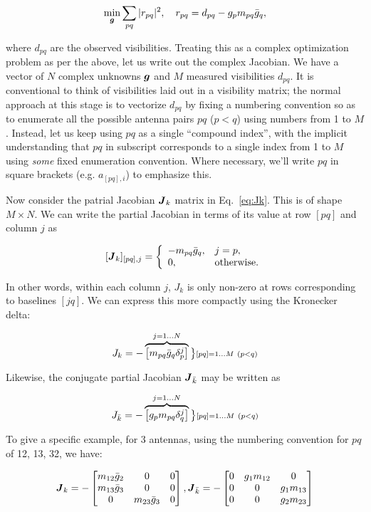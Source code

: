 \documentclass[useAMS,usenatbib]{mn2e}
\newcommand{\mat}[1]{{\bmath{#1}}}
\newcommand{\JJ}{\mat{J}} %
\begin{document}
\begin{equation}
\label{eq:cal:DI}
\min_{\bmath{g}}\sum_{pq}|r_{pq}|^2,~~~r_{pq}=d_{pq}-g_p m_{pq} \bar{g}_q, 
\end{equation}

where $d_{pq}$ are the observed visibilities. Treating this as a complex optimization problem as per the above, 
let us write out the complex Jacobian. 
We have a vector of $N$ complex unknowns $\bmath{g}$ and $M$ measured visibilities $d_{pq}$. It is conventional
to think of visibilities laid out in a visibility matrix; the normal approach at this stage is to vectorize $d_{pq}$ 
by fixing a numbering convention so as to enumerate all the possible antenna pairs $pq$ ($p<q$) using numbers from 1 to $M$.
Instead, let us keep using $pq$ as a single ``compound index'', with the implicit understanding that $pq$ in 
subscript corresponds to a single index from 1 to $M$ using \emph{some} fixed enumeration convention. 
Where necessary, we'll write $pq$ in square brackets (e.g. $a_{[pq],i}$) to emphasize this.

Now consider the patrial Jacobian $\JJ_k$ matrix in Eq.~\ref{eq:Jk}. This is of shape $M\times N$. We can write the
partial Jacobian in terms of its value at row $[pq]$ and column $j$ as 

\[
[ \JJ_k ]_{[pq],j} = \left \{  
  \begin{array}{ll} 
  -m_{pq}\bar{g}_q,& j=p, \\
  0, & \mathrm{otherwise.}
  \end{array}
\right .
\]

In other words, within each column $j$, $J_k$ is only non-zero at rows corresponding to baselines $[jq]$. We can express 
this more compactly using the Kronecker delta:


\[
J_k = - \overbrace{ \Matrix{c}{ m_{pq}\bar{g}_q\delta^{j}_p } } ^{j=1\dots N} \big \}{\scriptstyle [pq]=1\dots M~(p<q)}
\]

Likewise, the conjugate partial Jacobian $\JJ_{\bar{k}}$ may be written as

\[
J_{\bar{k}} = - \overbrace{ \Matrix{c}{ g_p m_{pq} \delta^{j}_q } } ^{j=1\dots N} \big \}{\scriptstyle [pq]=1\dots M~(p<q)}
\]

To give a specific example, for 3 antennas, using the numbering convention for $pq$ of
12, 13, 32, we have:

\[
\JJ_k = - \Matrix{ccc}{m_{12}\bar{g}_2 & 0 & 0 \\ m_{13}\bar{g}_3 & 0 & 0 \\ 0 & m_{23}\bar{g}_3 & 0 },
\JJ_{\bar{k}} = - \Matrix{ccc}{0 & g_1 m_{12} & 0 \\ 0 & 0 & g_1 m_{13} \\ 0 & 0 & g_2 m_{23} }
\]
\end{document}
